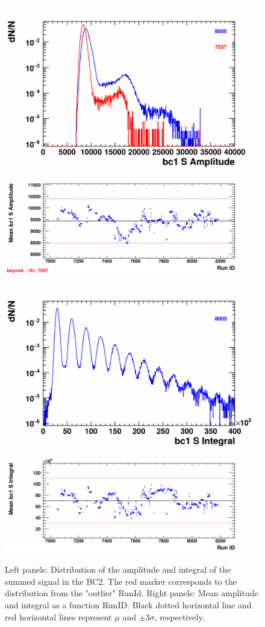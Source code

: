     \begin{figure}[H]
        \begin{center}
            \includegraphics[width=0.35\linewidth]{../pict/QA_RunByRun_24.12/H1/nVtxTr_h2_RunId_bc1sAmp.png}
            \includegraphics[width=0.60\linewidth]{../pict/QA_RunByRun_24.12/nVtxTr_h2_RunId_bc1sAmp.png}

            \includegraphics[width=0.35\linewidth]{../pict/QA_RunByRun_24.12/H1/nVtxTr_h2_RunId_bc1sInt.png}
            \includegraphics[width=0.60\linewidth]{../pict/QA_RunByRun_24.12/nVtxTr_h2_RunId_bc1sInt.png}
            \vspace{-3mm}
            \caption{Left panels: Distribution of the amplitude and integral of the summed signal in the BC2. The red marker corresponds to the distribution from the "outlier" RunId. Right panels: Mean amplitude and integral as a function RunID. Black dotted horizontal line and red horizontal lines represent $\mu$ and $\pm3\sigma$, respectively.}
            \label{fig:BC2}
        \end{center}
        \vspace{-5mm}
    \end{figure}




